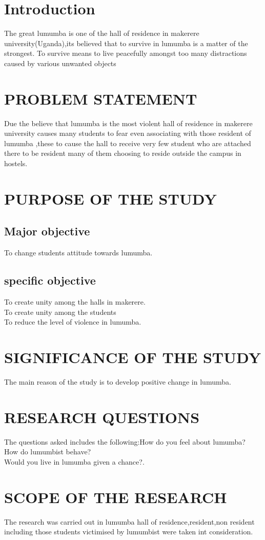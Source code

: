 \documentclass[10pt,A4paper]{article}
\begin{document}
\section{Introduction}
The great lumumba is one of the hall of residence in makerere university(Uganda),its believed that to survive in lumumba is a matter of the strongest.
To survive means to live peacefully amongst  too many distractions caused by various unwanted objects
\section{PROBLEM STATEMENT}
Due the believe that lumumba is the most violent hall of residence in makerere university causes many students to fear even associating with those resident of lumumba ,these to cause the hall to receive very few student who are attached there to be resident many of them choosing to reside outside the campus in hostels.
\section{ PURPOSE OF THE STUDY}
\subsection{Major objective}
To change students attitude towards lumumba.
\subsection{specific objective}
To create unity among the halls in makerere.\\
To create unity among the students\\
To reduce the level of violence in lumumba.
\section{SIGNIFICANCE OF THE STUDY}
The main reason of the study is to develop positive change in lumumba.
\section{RESEARCH QUESTIONS}
The questions asked includes the following:How do you feel about lumumba?\\How do lumumbist behave?\\Would you live in lumumba given a chance?.
\section{SCOPE OF THE RESEARCH}
The research was carried out in lumumba hall of residence,resident,non resident  including those students victimised by lumumbist were taken  int consideration.
\end{document}
